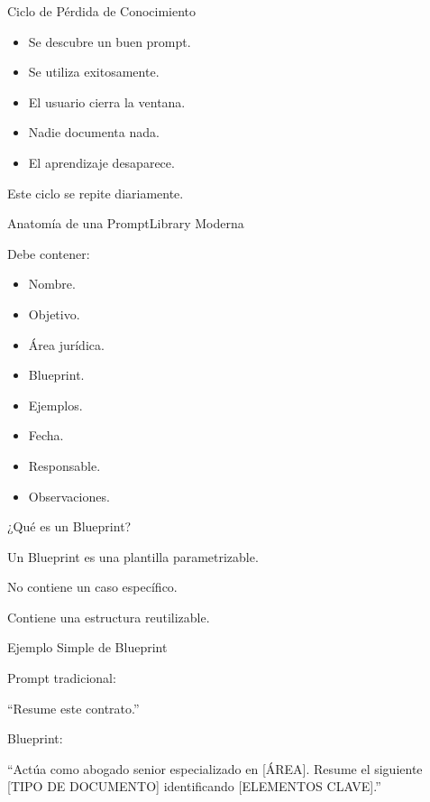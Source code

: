 \documentclass[aspectratio=169]{beamer}
\begin{document}
\begin{frame}{Ciclo de Pérdida de Conocimiento}


\begin{itemize}
  \item Se descubre un buen prompt.
  \item Se utiliza exitosamente.
  \item El usuario cierra la ventana.
  \item Nadie documenta nada.
  \item El aprendizaje desaparece.
\end{itemize}
Este ciclo se repite diariamente.

\end{frame}

\begin{frame}{Anatomía de una PromptLibrary Moderna}


Debe contener:

\begin{itemize}
  \item Nombre.
  \item Objetivo.
  \item Área jurídica.
  \item Blueprint.
  \item Ejemplos.
  \item Fecha.
  \item Responsable.
  \item Observaciones.
\end{itemize}
\end{frame}

\begin{frame}{¿Qué es un Blueprint?}


Un Blueprint es una plantilla parametrizable.

No contiene un caso específico.

Contiene una estructura reutilizable.

\end{frame}

\begin{frame}{Ejemplo Simple de Blueprint}


Prompt tradicional:

``Resume este contrato.''

Blueprint:

``Actúa como abogado senior especializado en [ÁREA]. Resume el siguiente [TIPO DE DOCUMENTO] identificando [ELEMENTOS CLAVE].''

\end{frame}
\end{document}
